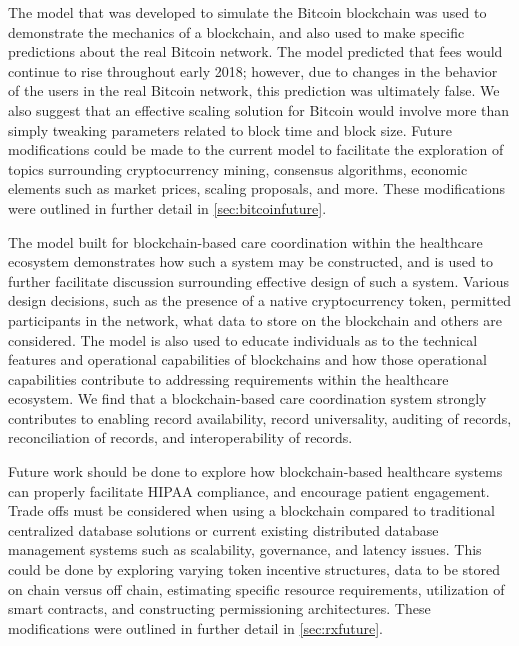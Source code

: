 \documentclass[12pt]{report}
\begin{document}
The model that was developed to simulate the Bitcoin blockchain was used to demonstrate the mechanics of a blockchain, and also used to make specific predictions about the real Bitcoin network. The model predicted that fees would continue to rise throughout early 2018; however, due to changes in the behavior of the users in the real Bitcoin network, this prediction was ultimately false. We also suggest that an effective scaling solution for Bitcoin would involve more than simply tweaking parameters related to block time and block size. Future modifications could be made to the current model to facilitate the exploration of topics surrounding cryptocurrency mining, consensus algorithms, economic elements such as market prices, scaling proposals, and more. These modifications were outlined in further detail in \autoref{sec:bitcoinfuture}.


The model built for blockchain-based care coordination within the healthcare ecosystem demonstrates how such a system may be constructed, and is used to further facilitate discussion surrounding effective design of such a system. Various design decisions, such as the presence of a native cryptocurrency token, permitted participants in the network, what data to store on the blockchain and others are considered. The model is also used to educate individuals as to the technical features and operational capabilities of blockchains and how those operational capabilities contribute to addressing requirements within the healthcare ecosystem. We find that a blockchain-based care coordination system strongly contributes to enabling record availability, record universality, auditing of records, reconciliation of records, and interoperability of records.

Future work should be done to explore how blockchain-based healthcare systems can properly facilitate HIPAA compliance, and encourage patient engagement. Trade offs must be considered when using a blockchain compared to traditional centralized database solutions or current existing distributed database management systems such as scalability, governance, and latency issues. This could be done by exploring varying token incentive structures, data to be stored on chain versus off chain, estimating specific resource requirements, utilization of smart contracts, and constructing permissioning architectures. These modifications were outlined in further detail in \autoref{sec:rxfuture}.
\end{document}
